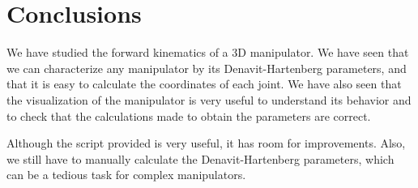 \section{Conclusions}
We have studied the forward kinematics of a 3D manipulator. We have seen that we can characterize any manipulator by its Denavit-Hartenberg parameters, and that it is easy to calculate the coordinates of each joint. 
We have also seen that the visualization of the manipulator is very useful to understand its behavior and to check that the calculations made to obtain the parameters are correct.

\bigskip Although the script provided is very useful, it has room for improvements. Also, we still have to manually calculate the Denavit-Hartenberg parameters, which can be a tedious task for complex manipulators.